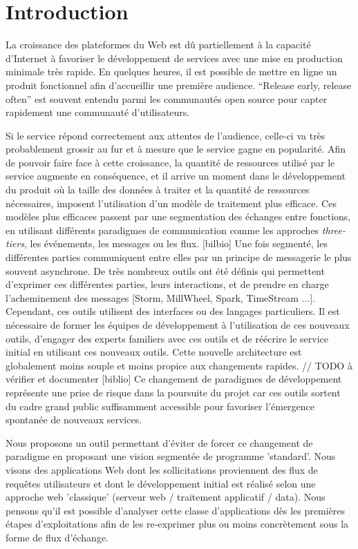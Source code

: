 \section{Introduction}

La croissance des plateformes du Web est dû partiellement à la capacité d'Internet à favoriser le développement de services avec une mise en production minimale très rapide.
En quelques heures, il est possible de mettre en ligne un produit fonctionnel afin d'accueillir une première audience.
``Release early, release often'' est souvent entendu parmi les communautés open source pour capter rapidement une communauté d'utilisateurs.

Si le service répond correctement aux attentes de l'audience, celle-ci va très probablement grossir au fur et à mesure que le service gagne en popularité.
Afin de pouvoir faire face à cette croissance, la quantité de ressources utilisé par le service augmente en conséquence, et il arrive un moment dans le développement du produit où la taille des données à traiter et la quantité de ressources nécessaires, imposent l'utilisation d'un modèle de traitement plus efficace.
Ces modèles plus efficaces passent par une segmentation des échanges entre
fonctions, en utilisant différents paradigmes de communication comme les
approches \textit{three-tiers}, les événements, les messages ou les flux. [bilbio]
Une fois segmenté, les différentes parties communiquent entre elles par un principe de messagerie le plus souvent asynchrone.
De très nombreux outils ont été définis qui permettent d'exprimer ces différentes parties, leurs interactions, et de prendre en charge l'acheminement des messages [Storm, MillWheel, Spark, TimeStream ...].
Cependant, ces outils utilisent des interfaces ou des langages particuliers. Il est nécessaire de former les équipes de développement à l'utilisation de ces nouveaux outils, d'engager des experts familiers avec ces outils et de réécrire le service initial en utilisant ces nouveaux outils.
Cette nouvelle architecture est globalement moins souple et moins propice aux changements rapides. // TODO à vérifier et documenter [biblio]
Ce changement de paradigmes de développement représente une prise de risque dans la poursuite du projet car ces outils sortent du cadre grand public suffisamment accessible pour favoriser l'émergence spontanée de nouveaux services.

Nous proposons un outil permettant d'éviter de forcer ce changement de paradigme en proposant une vision segmentée de programme 'standard'.
Nous visons des applications Web dont les sollicitations proviennent des flux de requêtes utilisateurs et dont le développement initial est réalisé selon une approche web 'classique' (serveur web / traitement applicatif / data).
Nous pensons qu'il est possible d'analyser cette classe d'applications dès les premières étapes d'exploitations afin de les re-exprimer plus ou moins concrètement sous la forme de flux d'échange.

